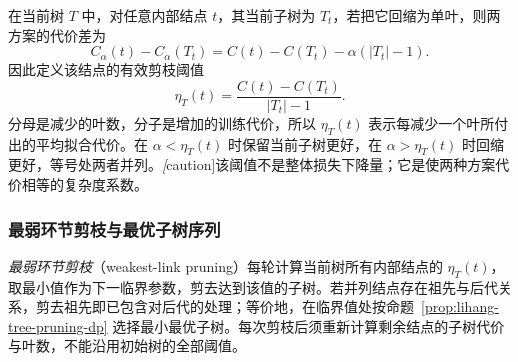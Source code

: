 在当前树 $T$ 中，对任意内部结点 $t$，其当前子树为 $T_t$，若把它回缩为单叶，则两方案的代价差为
\begin{equation}
  C_\alpha(t)-C_\alpha(T_t)
  =C(t)-C(T_t)-\alpha(|T_t|-1).
  \label{eq:lihang-cart-pruning-difference}
\end{equation}
因此定义该结点的有效剪枝阈值
\begin{equation}
  \eta_T(t)=\frac{C(t)-C(T_t)}{|T_t|-1}.
  \label{eq:lihang-cart-effective-alpha}
\end{equation}
分母是减少的叶数，分子是增加的训练代价，所以 $\eta_T(t)$ 表示每减少一个叶所付出的平均拟合代价。在 $\alpha<\eta_T(t)$ 时保留当前子树更好，在 $\alpha>\eta_T(t)$ 时回缩更好，等号处两者并列。\emph[caution]{该阈值不是整体损失下降量；它是使两种方案代价相等的复杂度系数。}

\subsubsection{最弱环节剪枝与最优子树序列}

\emph{最弱环节剪枝}（weakest-link pruning）每轮计算当前树所有内部结点的 $\eta_T(t)$，取最小值作为下一临界参数，剪去达到该值的子树。若并列结点存在祖先与后代关系，剪去祖先即已包含对后代的处理；等价地，在临界值处按命题~\ref{prop:lihang-tree-pruning-dp} 选择最小最优子树。每次剪枝后须重新计算剩余结点的子树代价与叶数，不能沿用初始树的全部阈值。

